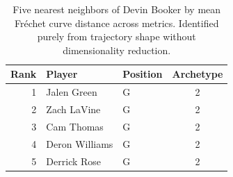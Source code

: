 \begin{table}[htbp]
  \centering\small
  \begin{tabular}{rllc}
    \toprule
    Rank & Player & Position & Archetype \\
    \midrule
    1 & Jalen Green & G & 2 \\
    2 & Zach LaVine & G & 2 \\
    3 & Cam Thomas & G & 2 \\
    4 & Deron Williams & G & 2 \\
    5 & Derrick Rose & G & 2 \\
    \bottomrule
  \end{tabular}
  \caption{Five nearest neighbors of Devin Booker by mean Fr\'{e}chet curve distance across metrics. Identified purely from trajectory shape without dimensionality reduction.}
  \label{tab:Devin_Booker_frechet_curve_neighbors}
\end{table}

